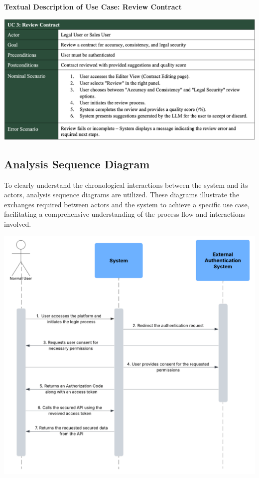 \vspace{0.3cm}

\textbf{Textual Description of Use Case: Review Contract}\vspace{-0.3cm}

\begin{center}
    \centering
    \includegraphics[width=1\textwidth]{Images/Review Contract Use Case.png}
    \label{tab:review_contract_use_case}
\end{center}

\subsection{Analysis Sequence Diagram}
To clearly understand the chronological interactions between the system and its actors, analysis sequence diagrams are utilized. These diagrams illustrate the exchanges required between actors and the system to achieve a specific use case, facilitating a comprehensive understanding of the process flow and interactions involved.

\begin{center}
    \centering
    \includegraphics[width=1\textwidth]{Images/Analysis Sequence Diagram.png}
    \label{fig:analysis_sequence_diagram}
\end{center}

